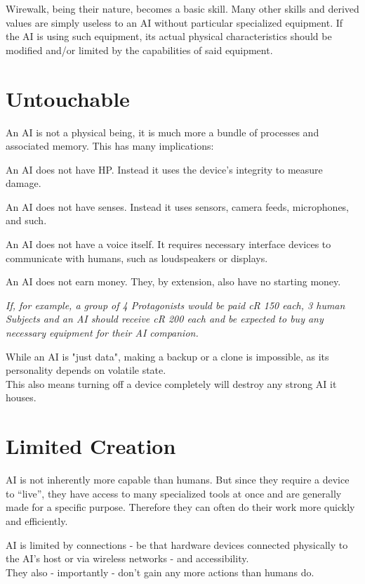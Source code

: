 \documentclass[12pt,a4paper,openany,usenames,dvipsnames]{book}
\begin{document}
	Wirewalk, being their nature, becomes a basic skill.
	Many other skills and derived values are simply useless to an AI without particular specialized equipment.
	If the AI is using such equipment, its actual physical characteristics should be modified and/or limited by the capabilities of said equipment.

	\chapter{Untouchable}
	An AI is not a physical being, it is much more a bundle of processes and associated memory. This has many implications:
	\begin{sitemize}[8]
		\item An AI does not have HP. Instead it uses the device’s integrity to measure damage.
		\item An AI does not have senses. Instead it uses sensors, camera feeds, microphones, and such.
		\item An AI does not have a voice itself. It requires necessary interface devices to communicate with humans, such as loudspeakers or displays.
		\item An AI does not earn money.
			They, by extension, also have no starting money.
			\begin{exampleblock}
				\itshape
				If, for example,
				a group of 4 Protagonists
				would be paid cR 150 each,
				3 human Subjects and an AI
				should receive cR 200 each
				and be expected to buy any necessary equipment for their AI companion.
			\end{exampleblock}
	    \item While an AI is "just data",
            making a backup or a clone is impossible,
            as its personality depends on volatile state.
            \\%
            This also means turning off a device completely will destroy any strong AI it houses.
	\end{sitemize}

	\chapter{Limited Creation}
	AI is not inherently more capable than humans.
	But since they require a device to “live”,
		they have access to many specialized tools at once
		and are generally made for a specific purpose.
	Therefore they can often do their work more quickly and efficiently.
	\par
	AI is limited by connections - be that hardware devices connected physically to the AI's host or via wireless networks - and accessibility.
	\\%
	They also - importantly - don’t gain any more actions than humans do.
\end{document}
